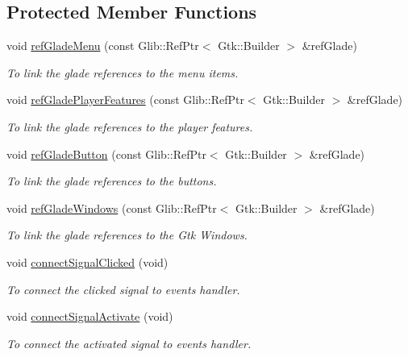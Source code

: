 \subsection*{Protected Member Functions}
\begin{DoxyCompactItemize}
\item 
void \hyperlink{classplayerWindow_a486fe7a44df376b49f2d847773eca869}{ref\-Glade\-Menu} (const Glib\-::\-Ref\-Ptr$<$ Gtk\-::\-Builder $>$ \&ref\-Glade)
\begin{DoxyCompactList}\small\item\em To link the glade references to the menu items. \end{DoxyCompactList}\item 
void \hyperlink{classplayerWindow_affdfa925162bbce0922c15aae1ef5484}{ref\-Glade\-Player\-Features} (const Glib\-::\-Ref\-Ptr$<$ Gtk\-::\-Builder $>$ \&ref\-Glade)
\begin{DoxyCompactList}\small\item\em To link the glade references to the player features. \end{DoxyCompactList}\item 
void \hyperlink{classplayerWindow_a032d1f4faff1cc3def44856d21ff2029}{ref\-Glade\-Button} (const Glib\-::\-Ref\-Ptr$<$ Gtk\-::\-Builder $>$ \&ref\-Glade)
\begin{DoxyCompactList}\small\item\em To link the glade references to the buttons. \end{DoxyCompactList}\item 
void \hyperlink{classplayerWindow_a5522bc90b88998851e87d364fe081b80}{ref\-Glade\-Windows} (const Glib\-::\-Ref\-Ptr$<$ Gtk\-::\-Builder $>$ \&ref\-Glade)
\begin{DoxyCompactList}\small\item\em To link the glade references to the Gtk Windows. \end{DoxyCompactList}\item 
void \hyperlink{classplayerWindow_aec83f536851af55b785045ad5ffeb3e1}{connect\-Signal\-Clicked} (void)
\begin{DoxyCompactList}\small\item\em To connect the clicked signal to events handler. \end{DoxyCompactList}\item 
void \hyperlink{classplayerWindow_a97c18421066539a211852f78f44c0d18}{connect\-Signal\-Activate} (void)
\begin{DoxyCompactList}\small\item\em To connect the activated signal to events handler. \end{DoxyCompactList}\item 

\end{DoxyCompactItemize}
